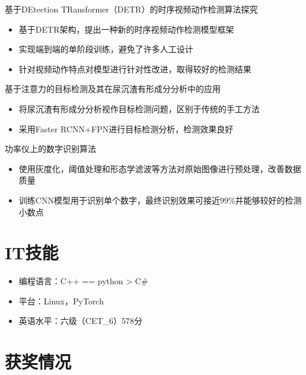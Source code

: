 \documentclass{resume}
\begin{document}
基于DEtection TRansformer（DETR）的时序视频动作检测算法探究
\begin{itemize}
  \item 基于DETR架构，提出一种新的时序视频动作检测模型框架
  \item 实现端到端的单阶段训练，避免了许多人工设计
  \item 针对视频动作特点对模型进行针对性改进，取得较好的检测结果
\end{itemize}

基于注意力的目标检测及其在尿沉渣有形成分分析中的应用
\begin{itemize}
  \item 将尿沉渣有形成分分析视作目标检测问题，区别于传统的手工方法
  \item 采用Faster RCNN+FPN进行目标检测分析，检测效果良好
\end{itemize}

功率仪上的数字识别算法
\begin{itemize}
  \item 使用灰度化，阈值处理和形态学滤波等方法对原始图像进行预处理，改善数据质量
  \item 训练CNN模型用于识别单个数字，最终识别效果可接近99\%并能够较好的检测小数点
\end{itemize}


\section{IT技能}
\begin{itemize}
  \item 编程语言：C++ == python > C\#
  \item 平台：Linux，PyTorch
  \item 英语水平：六级（CET\_6）578分
\end{itemize}

\section{获奖情况}

%
%
\end{document}
